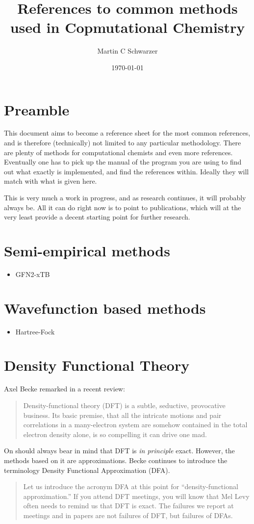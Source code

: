 \documentclass[   %
  final,          %
  a4paper,        %
  8pt
]{extarticle}
\title{References to common methods used in Copmutational Chemistry}
\author{Martin C Schwarzer}
\date{\today}
\begin{document}
\section*{Preamble}

This document aims to become a reference sheet for the most common references,
and is therefore (technically) not limited to any particular methodology.
There are plenty of methods for computational chemists and even more references.
Eventually one has to pick up the manual of the program you are using to
find out what exactly is implemented, and find the references within.
Ideally they will match with what is given here.

This is very much a work in progress, and as research continues,
it will probably always be.
All it can do right now is to point to publications, 
which will at the very least provide a decent starting point for further research.

\section{Semi-empirical methods}
\begin{itemize}
  \item GFN2-xTB\autocite{gfn2xtb}
\end{itemize}

\section{Wavefunction based methods}
\begin{itemize}
  \item Hartree-Fock
\end{itemize}

\section{Density Functional Theory}
Axel Becke remarked in a recent review:\autocite{Becke2014}
\begin{quote}
  Density-functional theory (DFT) is a subtle, seductive, provocative business. 
  Its basic premise, that all the intricate motions and pair correlations in 
  a many-electron system are somehow contained in the total electron density alone, 
  is so compelling it can drive one mad.
\end{quote}

On should always bear in mind that DFT is \emph{in principle} exact.
However, the methods based on it are approximations. 
Becke continues to introduce the terminology Density Functional Approximation (DFA).
\begin{quote}
  Let us introduce the acronym DFA at this point for “density-functional approximation.” If you attend DFT meetings, you will know that Mel Levy often needs to remind us that DFT is exact. The failures we report at meetings and in papers are not failures of DFT, but failures of DFAs.
\end{quote}
\end{document}
